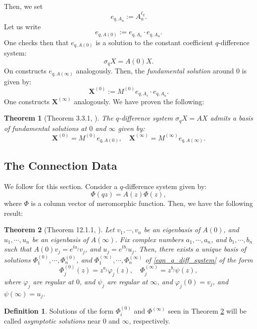 \documentclass[a4paper]{report}
\newtheorem{theorem}{Theorem}
\theoremstyle{theorem}
\theoremstyle{definition}
\newtheorem{definition}{Definition}
\theoremstyle{remark}
\theoremstyle{proposition}
\theoremstyle{conjecture}
\theoremstyle{lemma}
\theoremstyle{corollary}
\theoremstyle{exercise}
\theoremstyle{example}
\begin{document}
  Then, we set $$e_{q,A_u} := A_u^{\ell_q}.$$
  Let us write $$e_{q,A(0)} := e_{q,A_s}\cdot e_{q,A_u}.$$
  One checks then that $e_{q,A(0)}$ is a solution to the constant coefficient $q$-difference system:
  $$\sigma_qX = A(0) X.$$
  On constructs $e_{q,A(\infty)}$ analogously.
  Then, the \emph{fundamental solution} around $0$ is given by: $$\mathbf{X}^{(0)} := M^{(0)} e_{q,A_s} \cdot e_{q,A_u}.$$ 
  One constructs $\mathbf{X}^{(\infty)}$ analogously.
  We have proven the following:
  \begin{theorem}[Theorem 3.3.1, \cite{sau16}]\label{thm_const_coeff_solns}
      The $q$-difference system $\sigma_qX = AX$ admits a basis of fundamental
      solutions at $0$ and $\infty$ given by:
      $$\mathbf{X}^{(0)} = M^{(0)}e_{q,A(0)},\quad \mathbf{X}^{(\infty)} = M^{(\infty)} e_{q,A(\infty)}.$$
  \end{theorem}
  
  
  \subsection{The Connection Data}
  
  We follow \cite[Chapter 12]{efk98} for this section. Consider a $q$-difference
  system given by:
  \begin{equation}\label{eqn_q_diff_system}
      \Phi(qz) = A(z) \Phi(z),
  \end{equation}
  where $\Phi$ is a column vector of meromorphic function. Then, we have the following
  result:
  \begin{theorem}[Theorem 12.1.1, \cite{efk98}]\label{thm_asymptotic_soln}
      Let $v_1,\cdots,v_n$ be an eigenbasis of $A(0)$, and 
      $u_1,\cdots,u_n$ be an eigenbasis of $A(\infty)$. Fix complex numbers
      $a_1,\cdots, a_n$, and $b_1,\cdots,b_n$ such that 
      $A(0) v_j = e^{ta_j}v_j$, and $u_j = e^{tb_j}u_j$. Then, there exists a 
      unique basis of solutions $\Phi_1^{(0)},\cdots, \Phi_n^{(0)}$, and 
      $\Phi_1^{(\infty)},\cdots,\Phi_n^{(\infty)}$ of \eqref{eqn_q_diff_system}
      of the form
      $$\Phi_j^{(0)}(z) = z^{a_j} \varphi_j(z),\quad \Phi_j^{(\infty)} = z^{b_j}\psi(z),$$
      where $\varphi_j$ are regular at $0$, and $\psi_j$ are regular at $\infty$,
      and $\varphi_j(0) = v_j$, and $\psi(\infty) = u_j$.
  \end{theorem}
  
  \begin{definition}
      Solutions of the form $\Phi_i^{(0)}$ and $\Phi^{(\infty)}$ seen in 
      Theorem \ref{thm_asymptotic_soln} will be called 
      \emph{asymptotic solutions} near $0$ and $\infty$, respectively.
  \end{definition}
  
\end{document}
